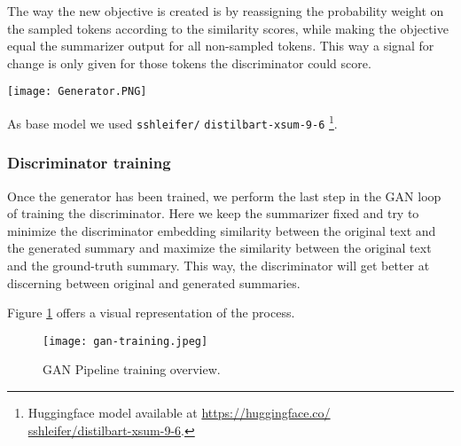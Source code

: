 \documentclass[11pt]{article}
\begin{document}
The way the new objective is created is by reassigning the probability weight on the sampled tokens according to the similarity scores, while making the objective equal the summarizer output for all non-sampled tokens. This way a signal for change is only given for those tokens the discriminator could score.

\begin{figure*}[h]
\centering
\texttt{[image: Generator.PNG]}
\centering
\caption{Overview of the generator training. At each step the discriminator receives the generated summary up to that step, as well as the list of top-$k$ next-token candidates. These tokens are then ranked according to the discriminator criteria. In order to improve efficiency, the generated summary is cached so only the evaluation of the candidate tokens has to be run multiple times.}
\label{fig:gen_training}
\end{figure*} 

As base model we used \texttt{sshleifer/} \texttt{distilbart-xsum-9-6} \footnote{Huggingface model available at \href{https://huggingface.co/sshleifer/distilbart-xsum-9-6}{https://huggingface.co/} \\ \href{https://huggingface.co/sshleifer/distilbart-xsum-9-6}{sshleifer/distilbart-xsum-9-6}.}.

\subsubsection{Discriminator training}

Once the generator has been trained, we perform the last step in the GAN loop of training the discriminator. Here we keep the summarizer fixed and try to minimize the discriminator embedding similarity between the original text and the generated summary and maximize the similarity between the original text and the ground-truth summary. This way, the discriminator will get better at discerning between original and generated summaries. 

Figure \ref{fig:gan_training} offers a visual representation of the process.

\begin{figure}[h]
\centering
\begin{minipage}[t]{1\linewidth}
\texttt{[image: gan-training.jpeg]}
\end{minipage}
\centering
\caption{GAN Pipeline training overview.}
\label{fig:gan_training}
\end{figure} 
\end{document}
